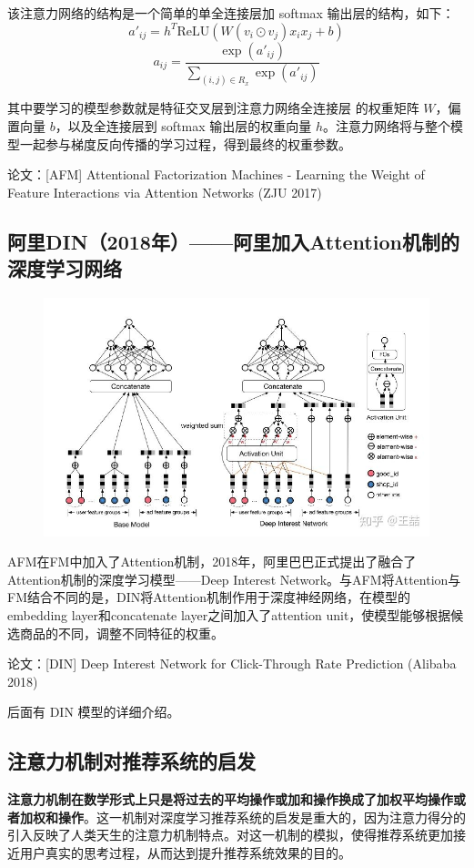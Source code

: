 \documentclass[12pt]{article}
\begin{document}
该注意力网络的结构是一个简单的单全连接层加 softmax 输出层的结构，如下：
$$
a'_{ij} = h^T \text{ReLU} (W(v_i \odot v_j)x_ix_j + b)
$$
$$
a_{ij} = \frac{\exp(a'_{ij})}{\sum_{(i,j) \in R_x}\exp(a'_{ij})}
$$

其中要学习的模型参数就是特征交叉层到注意力网络全连接层
的权重矩阵 $W$，偏置向量 $b$，以及全连接层到 softmax 输出层的权重向量 $h$。注意力网络将与整个模型一起参与梯度反向传播的学习过程，得到最终的权重参数。

论文：[AFM] Attentional Factorization Machines - Learning the Weight of Feature Interactions via Attention Networks (ZJU 2017)

\subsection{阿里DIN（2018年）——阿里加入Attention机制的深度学习网络}
\begin{figure}[H]
    \centering
    \includegraphics[width=.8\textwidth]{fig/Ali_DIN_Structure.jpg}
\end{figure}

AFM在FM中加入了Attention机制，2018年，阿里巴巴正式提出了融合了Attention机制的深度学习模型——Deep Interest Network。与AFM将Attention与FM结合不同的是，DIN将Attention机制作用于深度神经网络，在模型的embedding layer和concatenate layer之间加入了attention unit，使模型能够根据候选商品的不同，调整不同特征的权重。

论文：[DIN] Deep Interest Network for Click-Through Rate Prediction (Alibaba 2018)

后面有 DIN 模型的详细介绍。

\subsection{注意力机制对推荐系统的启发}
\textbf{注意力机制在数学形式上只是将过去的平均操作或加和操作换成了加权平均操作或者加权和操作}。这一机制对深度学习推荐系统的启发是重大的，因为注意力得分的引入反映了人类天生的注意力机制特点。对这一机制的模拟，使得推荐系统更加接近用户真实的思考过程，从而达到提升推荐系统效果的目的。
\end{document}
